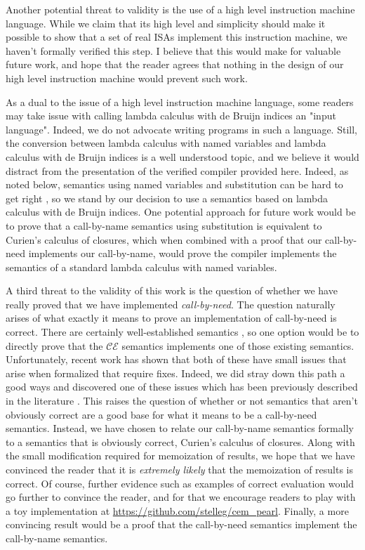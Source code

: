 Another potential threat to validity is the use of a high level instruction
machine language. While we claim that its high level and simplicity should make
it possible to show that a set of real ISAs implement this instruction machine,
we haven't formally verified this step. I believe that this would make
for valuable future work, and hope that the reader agrees that nothing in the
design of our high level instruction machine would prevent such work.

As a dual to the issue of a high level instruction machine language, some
readers may take issue with calling lambda calculus with de Bruijn indices an
"input language". Indeed, we do not advocate writing programs in such a
language. Still, the conversion between lambda calculus with named variables and
lambda calculus with de Bruijn indices is a well understood topic, and we
believe it would distract from the presentation of the verified compiler
provided here. Indeed, as noted below, semantics using named variables and
substitution can be hard to get right \cite{breitnerthesis, nakata2009small}, so
we stand by our decision to use a semantics based on lambda calculus with de
Bruijn indices. One potential approach for future work would be to prove that a
call-by-name semantics using substitution is equivalent to Curien's calculus of
closures, which when combined with a proof that our call-by-need implements our
call-by-name, would prove the compiler implements the semantics of a standard
lambda calculus with named variables.

A third threat to the validity of this work is the question of whether 
we have really proved that we have implemented \emph{call-by-need}. The question
naturally arises of what exactly it means to prove an implementation of
call-by-need is correct. There are certainly well-established semantics
\cite{launchburynatural, ariola1995call}, so one option would be to directly
prove that the $\mathcal{CE}$ semantics implements one of those existing
semantics.  Unfortunately, recent work has shown that both of these have small
issues that arise when formalized that require fixes. Indeed, we did stray down
this path a good ways and discovered one of these issues which has been
previously described in the literature \cite{nakata2009small}. This raises the
question of whether or not semantics that aren't obviously correct are a good
base for what it means to be a call-by-need semantics. Instead, we have chosen to
relate our call-by-name semantics formally to a semantics that is obviously
correct, Curien's calculus of closures. Along with the small modification
required for memoization of results, we hope that we have convinced the reader
that it is \emph{extremely likely} that the memoization of results is correct.
Of course, further evidence such as examples of correct evaluation would go
further to convince the reader, and for that we encourage readers to
play with a toy implementation at \url{https://github.com/stelleg/cem_pearl}.
Finally, a more convincing result would be a proof that the call-by-need
semantics implement the call-by-name semantics. 

